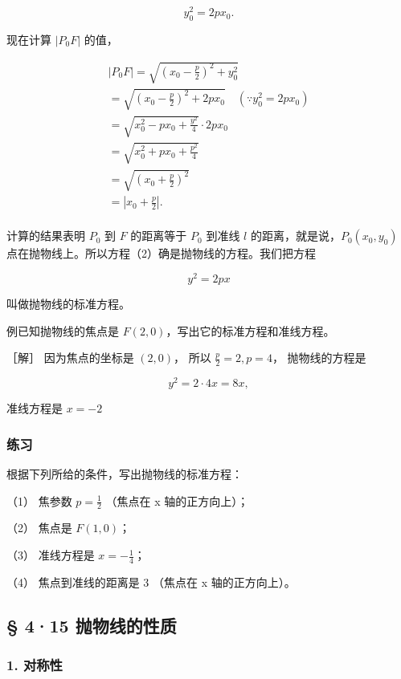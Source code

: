 \[
y_{0} ^ {2} = 2 p x_{0}.
\]

现在计算 \(|P_{0}F|\) 的值，

\[
\begin{array}{l} \left| P_{0} F \right| = \sqrt {\left(x_{0} - \frac {p}{2}\right) ^ {2} + y_{0} ^ {2}} \\ = \sqrt {\left(x_{0} - \frac {p}{2}\right) ^ {2} + 2 p x_{0}} \quad (\because y_{0} ^ {2} = 2 p x_{0}) \\ = \sqrt {x_{0} ^ {2} - p x_{0} + \frac {y^{2}}{4}} \cdot 2 p x_{0} \\ = \sqrt {x_{0} ^ {2} + p x_{0} + \frac {p^{2}}{4}} \\ = \sqrt {\left(x_{0} + \frac {p}{2}\right) ^ {2}} \\ = \left| x_{0} + \frac {p}{2} \right|. \\ \end{array}
\]

计算的结果表明 \(P_0\) 到 \(F\) 的距离等于 \(P_0\) 到准线 \(l\)
的距离，就是说，\(P_0(x_0, y_0)\)
点在抛物线上。所以方程（2）确是抛物线的方程。我们把方程

\[
y^{2} = 2 p x
\]

叫做抛物线的标准方程。

例已知抛物线的焦点是 \(F(2,0)\)，写出它的标准方程和准线方程。

［解］ 因为焦点的坐标是 \((2,0)\)， 所以 \(\frac{p}{2} = 2, p = 4\)，
抛物线的方程是

\[
y^{2} = 2 \cdot 4 x = 8 x,
\]

准线方程是 \(x = -2\)

\subsubsection{练习}\label{ux7ec3ux4e60-9}

根据下列所给的条件，写出抛物线的标准方程：

（1） 焦参数 \(p=\frac{1}{2}\) （焦点在 x 轴的正方向上）；

（2） 焦点是 \(F(1,0)\)；

（3） 准线方程是 \(x = -\frac{1}{4}\)；

（4） 焦点到准线的距离是 3 （焦点在 x 轴的正方向上）。

\subsection{§ 4·15
抛物线的性质}\label{ux629bux7269ux7ebfux7684ux6027ux8d28}

\subsubsection{1. 对称性}\label{ux5bf9ux79f0ux6027-2}

